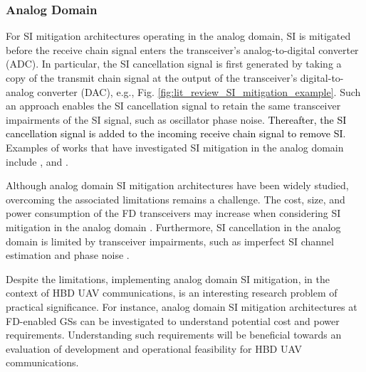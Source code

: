 \subsubsection{Analog Domain}
For SI mitigation architectures operating in the analog domain, SI is mitigated before the receive chain signal enters the transceiver's analog-to-digital converter (ADC). In particular, the SI cancellation signal is first generated by taking a copy of the transmit chain signal at the output of the transceiver's digital-to-analog converter (DAC), e.g., Fig. \ref{fig:lit_review_SI_mitigation_example}. Such an approach enables the SI cancellation signal to retain the same transceiver impairments of the SI signal, such as oscillator phase noise. \textcolor{black}{Thereafter, the SI cancellation signal is added to the incoming receive chain signal to remove SI}. Examples of works that have investigated SI mitigation in the analog domain include \cite{sahai2013impact,ahmed2013rate}, and \cite{syrjala2016analysis}. 

Although analog domain SI mitigation architectures have been widely studied, overcoming the associated limitations remains a challenge. The cost, size, and power consumption of the FD transceivers may increase when considering SI mitigation in the analog domain \cite{bernhardt2018self}. Furthermore, SI cancellation in the analog domain is limited by transceiver impairments, such as imperfect SI channel estimation and  phase noise \cite{sahai2013impact}.

Despite the limitations, implementing analog domain SI mitigation, in the context of HBD UAV communications, is an interesting research problem of practical significance. For instance, analog domain SI mitigation architectures at FD-enabled GSs can be investigated to understand potential cost and power requirements. Understanding such requirements will be beneficial towards an evaluation of development and operational feasibility for HBD UAV communications.

